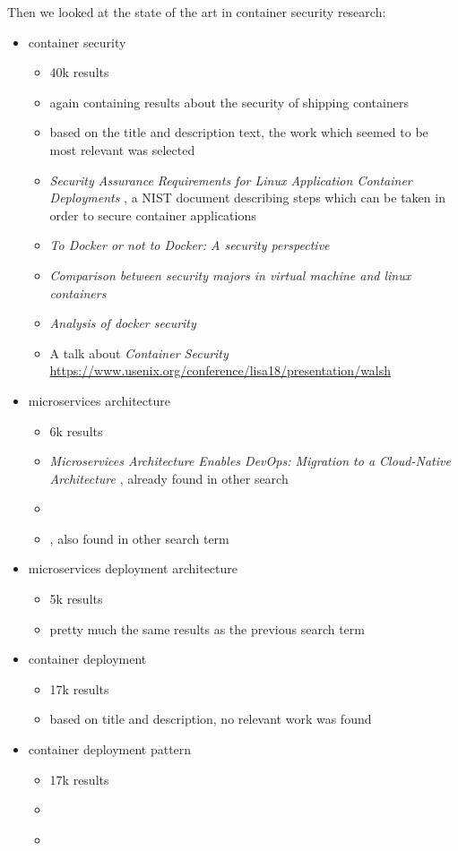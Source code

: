 \documentclass[conference]{IEEEtran}
\begin{document}
Then we looked at the state of the art in container security research:
\begin{itemize}
\item container security
\begin{itemize}
    \item 40k results
	\item again containing results about the security of shipping containers
	\item based on the title and description text, the work which seemed to be most relevant was selected
	\item \textit{Security Assurance Requirements for Linux Application Container Deployments} \cite{chandramouli2017security}, a NIST document describing steps which can be taken in order to secure container applications
	\item \textit{To Docker or not to Docker: A security perspective} \cite{combe2016docker}
	\item \textit{Comparison between security majors in virtual machine and linux containers} \cite{gupta2015comparison}
	\item \textit{Analysis of docker security} \cite{bui2015analysis}
	\item A talk about \textit{Container Security
} \url{https://www.usenix.org/conference/lisa18/presentation/walsh}
\end{itemize}
\item microservices architecture
\begin{itemize}
	\item 6k results
	\item \textit{Microservices Architecture Enables DevOps: Migration to a Cloud-Native Architecture} \cite{Balalaie2016}, already found in other search
	\item \cite{Jaramillo2016}
	\item \cite{Bakshi2017}, also found in other search term
\end{itemize}
\item microservices deployment architecture
\begin{itemize}
    \item 5k results
	\item pretty much the same results as the previous search term
\end{itemize}
\item container deployment
\begin{itemize}
	\item 17k results
	\item based on title and description, no relevant work was found
\end{itemize}
\item container deployment pattern
\begin{itemize}
	\item 17k results
	\item \cite{Burns2016}
	\item \cite{Syed2015}
\end{itemize}
\end{itemize}
\end{document}
